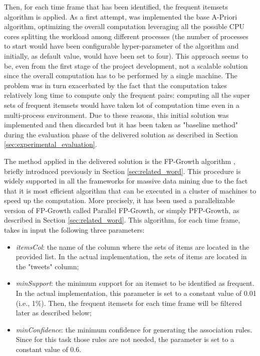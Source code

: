 Then, for each time frame that has been identified, the frequent itemsets algorithm is applied. As a first attempt, was implemented the base A-Priori algorithm, optimizing the overall computation leveraging all the possible CPU cores splitting the workload among different processes (the number of processes to start would have been configurable hyper-parameter of the algorithm and initially, as default value, would have been set to four). This approach seems to be, even from the first stage of the project development, not a scalable solution since the overall computation has to be performed by a single machine. The problem was in turn exacerbated by the fact that the computation takes relatively long time to compute only the frequent pairs: computing all the super sets of frequent itemsets would have taken lot of computation time even in a multi-process environment. Due to these reasons, this initial solution was implemented and then discarded but it has been taken as "baseline method" during the evaluation phase of the delivered solution as described in Section \ref{sec:experimental_evaluation}.

The method applied in the delivered solution is the FP-Growth algorithm \cite{fpgrowth-paper}, briefly introduced previously in Section \ref{sec:related_word}. This procedure is widely supported in all the frameworks for massive data mining due to the fact that it is most efficient algorithm that can be executed in a cluster of machines to speed up the computation. More precisely, it has been used a parallelizable version of FP-Growth called Parallel FP-Growth, or simply PFP-Growth, as described in Section \ref{sec:related_word}. This algorithm, for each time frame, takes in input the following three parameters:
\begin{itemize}
	\item \textit{itemsCol}: the name of the column where the sets of items are located in the provided list. In the actual implementation, the sets of items are located in the "tweets" column;
	\item \textit{minSupport}: the minimum support for an itemset to be identified as frequent. In the actual implementation, this parameter is set to a constant value of 0.01 (i.e., 1\%). Then, the frequent itemsets for each time frame will be filtered later as described below;
	\item \textit{minConfidence}: the minimum confidence for generating the association rules. Since for this task those rules are not needed, the parameter is set to a constant value of 0.6.
\end{itemize}

